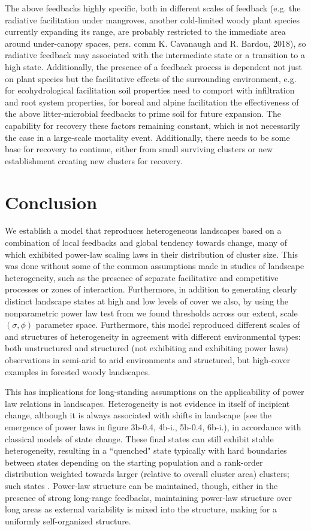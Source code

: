 \documentclass[10pt]{article}
\begin{document}
\begin{linenumbers}
The above feedbacks highly specific, both in different scales of feedback (e.g. the radiative facilitation under mangroves, another cold-limited woody plant species currently expanding its range, are probably restricted to the immediate area around under-canopy spaces, pers. comm K. Cavanaugh and R. Bardou, 2018), so radiative feedback may associated with the intermediate state or a transition to a high state. Additionally, the presence of a feedback process is dependent not just on plant species but the facilitative effects of the surrounding environment, e.g. for ecohydrological facilitation soil properties need to comport with infiltration and root system properties, for boreal and alpine facilitation the effectiveness of the above litter-microbial feedbacks to prime soil for future expansion. The capability for recovery these factors remaining constant, which is not necessarily the case in a large-scale mortality event. Additionally, there needs to be some base for recovery to continue, either from small surviving clusters or new establishment creating new clusters for recovery.

\section{Conclusion}

We establish a model that reproduces heterogeneous landscapes based on a combination of local feedbacks and global tendency towards change, many of which exhibited power-law scaling laws in their distribution of cluster size. This was done without some of the common assumptions made in studies of landscape heterogeneity, such as the presence of separate facilitative and competitive processes or zones of interaction. Furthermore, in addition to generating clearly distinct landscape states at high and low levels of cover we also, by using the nonparametric power law test from \citep{Clauset2009} we found thresholds across our extent, scale $(\sigma, \phi)$ parameter space. Furthermore, this model reproduced different scales of and structures of heterogeneity in agreement with different environmental types: both unstructured and structured (not exhibiting and exhibiting power laws) observations in semi-arid to arid environments and structured, but high-cover examples in forested woody landscapes.

This has implications for long-standing assumptions on the applicability of power law relations in landscapes. Heterogeneity is not evidence in itself of incipient change, although it is always associated with shifts in landscape (see the emergence of power laws in figure 3b-0.4, 4b-i., 5b-0.4, 6b-i.), in accordance with classical models of state change. These final states can still exhibit stable heterogeneity, resulting in a ``quenched" state typically with hard boundaries between states depending on the starting population and a rank-order distribution weighted towards larger (relative to overall cluster area) clusters; such states . Power-law structure can be maintained, though, either in the presence of strong long-range feedbacks, maintaining power-law structure over long areas as external variability is mixed into the structure, making for a uniformly self-organized structure. 


\end{linenumbers}
\end{document}

